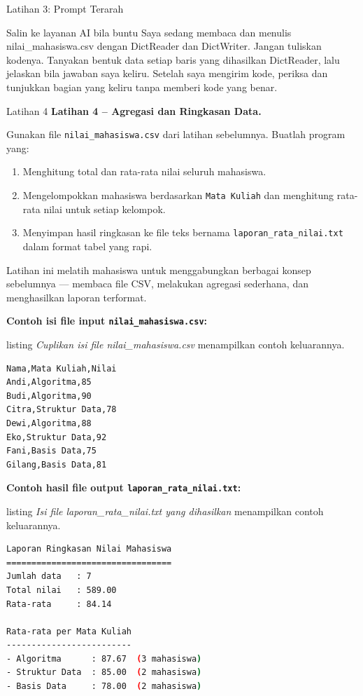 \documentclass[aspectratio=169, table]{beamer}
\begin{document}
\begin{frame}{Latihan 3: Prompt Terarah}
\begin{block}{Salin ke layanan AI bila buntu}
\small Saya sedang membaca dan menulis nilai\_mahasiswa.csv dengan DictReader dan DictWriter. Jangan tuliskan kodenya. Tanyakan bentuk data setiap baris yang dihasilkan DictReader, lalu jelaskan bila jawaban saya keliru. Setelah saya mengirim kode, periksa dan tunjukkan bagian yang keliru tanpa memberi kode yang benar.
\end{block}
\end{frame}

\begin{frame}[fragile,allowframebreaks=0.8]{Latihan 4}
\footnotesize
\textbf{Latihan 4 – Agregasi dan Ringkasan Data.}\par\medskip
Gunakan file \texttt{nilai\_mahasiswa.csv} dari latihan sebelumnya.  
Buatlah program yang:
\begin{enumerate}
    \item Menghitung total dan rata-rata nilai seluruh mahasiswa.  
    \item Mengelompokkan mahasiswa berdasarkan \texttt{Mata Kuliah} dan menghitung rata-rata nilai untuk setiap kelompok.  
    \item Menyimpan hasil ringkasan ke file teks bernama \texttt{laporan\_rata\_nilai.txt} dalam format tabel yang rapi.  
\end{enumerate}
Latihan ini melatih mahasiswa untuk menggabungkan berbagai konsep sebelumnya — membaca file CSV, melakukan agregasi sederhana, dan menghasilkan laporan terformat.

\noindent\textbf{Contoh isi file input \texttt{nilai\_mahasiswa.csv}:}

listing \textit{Cuplikan isi file nilai_mahasiswa.csv} menampilkan contoh keluarannya.

\begin{lstlisting}[language=bash, breaklines=true, basicstyle=\ttfamily\scriptsize]
Nama,Mata Kuliah,Nilai
Andi,Algoritma,85
Budi,Algoritma,90
Citra,Struktur Data,78
Dewi,Algoritma,88
Eko,Struktur Data,92
Fani,Basis Data,75
Gilang,Basis Data,81
\end{lstlisting}

\noindent\textbf{Contoh hasil file output \texttt{laporan\_rata\_nilai.txt}:}

listing \textit{Isi file laporan_rata_nilai.txt yang dihasilkan} menampilkan contoh keluarannya.

\begin{lstlisting}[language=bash, breaklines=true, basicstyle=\ttfamily\scriptsize]
Laporan Ringkasan Nilai Mahasiswa
=================================
Jumlah data   : 7
Total nilai   : 589.00
Rata-rata     : 84.14

Rata-rata per Mata Kuliah
-------------------------
- Algoritma      : 87.67  (3 mahasiswa)
- Struktur Data  : 85.00  (2 mahasiswa)
- Basis Data     : 78.00  (2 mahasiswa)
\end{lstlisting}
\end{frame}
\end{document}
